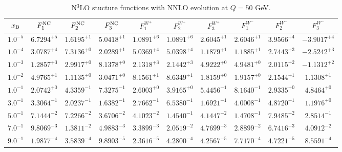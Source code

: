 \begin{table}[h]
\begin{adjustbox}{width=\textwidth}
\begin{tabular}{|c||c|c|c|c|c|c|c|c|c|}
\hline
$x_{\rm B}$ & $F_1^{\rm NC}$ & $F_2^{\rm NC}$ & $F_3^{\rm NC}$ & $F_1^{W^+}$ & $F_2^{W^+}$ & $F_3^{W^+}$ & $F_1^{W^-}$ & $F_2^{W^-}$ & $F_3^{W^-}$ \\
\hline
$ 1.0^{-5}$ & $ 6.7294^{+5}$ & $ 1.6195^{+1}$ & $ 5.0418^{+1}$ & $ 1.0891^{+6}$ & $ 1.0891^{+6}$ & $ 2.6045^{+1}$ & $ 2.6046^{+1}$ & $ 3.9566^{+4}$ & $-3.9017^{+4}$ \\
$ 1.0^{-4}$ & $ 3.0787^{+4}$ & $ 7.3136^{+0}$ & $ 2.0289^{+1}$ & $ 5.0369^{+4}$ & $ 5.0398^{+4}$ & $ 1.1879^{+1}$ & $ 1.1885^{+1}$ & $ 2.7443^{+3}$ & $-2.5242^{+3}$ \\
$ 1.0^{-3}$ & $ 1.2857^{+3}$ & $ 2.9917^{+0}$ & $ 8.1378^{+0}$ & $ 2.1318^{+3}$ & $ 2.1442^{+3}$ & $ 4.9222^{+0}$ & $ 4.9481^{+0}$ & $ 2.0115^{+2}$ & $-1.1312^{+2}$ \\
$ 1.0^{-2}$ & $ 4.9765^{+1}$ & $ 1.1135^{+0}$ & $ 3.0471^{+0}$ & $ 8.1561^{+1}$ & $ 8.6349^{+1}$ & $ 1.8159^{+0}$ & $ 1.9157^{+0}$ & $ 2.1544^{+1}$ & $ 1.1308^{+1}$ \\
$ 1.0^{-1}$ & $ 2.0742^{+0}$ & $ 4.3359^{-1}$ & $ 7.3275^{-1}$ & $ 2.6003^{+0}$ & $ 3.9165^{+0}$ & $ 5.4456^{-1}$ & $ 8.1640^{-1}$ & $ 2.9335^{+0}$ & $ 4.8464^{+0}$ \\
$ 3.0^{-1}$ & $ 3.3064^{-1}$ & $ 2.0237^{-1}$ & $ 1.6382^{-1}$ & $ 2.7662^{-1}$ & $ 6.5380^{-1}$ & $ 1.6921^{-1}$ & $ 4.0008^{-1}$ & $ 4.8720^{-1}$ & $ 1.1976^{+0}$ \\
$ 5.0^{-1}$ & $ 7.1444^{-2}$ & $ 7.2266^{-2}$ & $ 3.6706^{-2}$ & $ 4.1023^{-2}$ & $ 1.4540^{-1}$ & $ 4.1447^{-2}$ & $ 1.4708^{-1}$ & $ 7.9485^{-2}$ & $ 2.8514^{-1}$ \\
$ 7.0^{-1}$ & $ 9.8069^{-3}$ & $ 1.3811^{-2}$ & $ 4.9883^{-3}$ & $ 3.3899^{-3}$ & $ 2.0519^{-2}$ & $ 4.7699^{-3}$ & $ 2.8899^{-2}$ & $ 6.7416^{-3}$ & $ 4.0912^{-2}$ \\
$ 9.0^{-1}$ & $ 1.9877^{-4}$ & $ 3.5839^{-4}$ & $ 9.8903^{-5}$ & $ 2.3616^{-5}$ & $ 4.2800^{-4}$ & $ 4.2567^{-5}$ & $ 7.7170^{-4}$ & $ 4.7221^{-5}$ & $ 8.5591^{-4}$ \\
\hline
\end{tabular}
\end{adjustbox}\caption{N$^{3}$LO stucture functions with NNLO evolution at $Q = 50$ GeV.}
\label{tab:N3LO-Q50}
\end{table}


